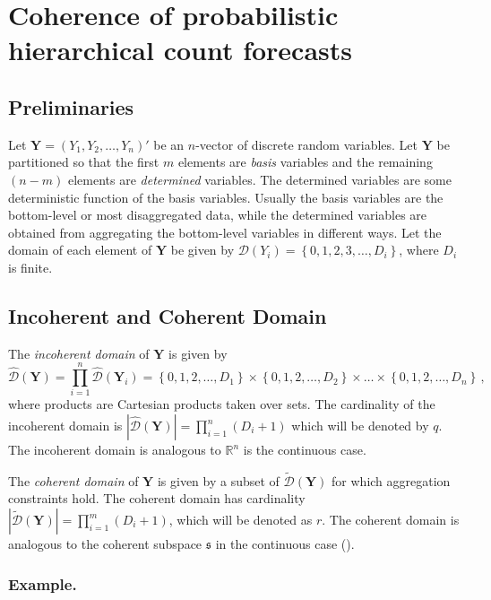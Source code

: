 \documentclass[a4paper,review,12pt,authoryear]{elsarticle}
\newcommand{\bY}{\mathbf{Y}}
\begin{document}
\section{Coherence of probabilistic hierarchical count forecasts}

\label{sec:coherence}

	
\subsection{Preliminaries}
Let $\bY=\left(Y_1,Y_2,\ldots,Y_n\right)'$ be an $n$-vector of discrete random variables.
Let $\bY$ be partitioned so that the first $m$ elements are \textit{basis} variables and the remaining $(n-m)$ elements are \textit{determined} variables.
The determined variables are some deterministic function of the basis variables. Usually the basis variables are the bottom-level or most disaggregated data, while the determined variables are obtained from aggregating the bottom-level variables in different ways. 
Let the domain of each element of $\bY$ be given by $\mathcal{D}(Y_i)=\left\{0, 1,2,3,\dots,D_i\right\}$, where $D_i$ is finite.

\subsection{Incoherent and Coherent Domain}
The \textit{incoherent domain} of $\bY$ is given by
\[
\hat{\mathcal D}(\bY)=\prod\limits_{i=1}^n\hat{\mathcal D}(\bY_i)=\left\{0, 1,2,\dots,D_1\right\}\times\left\{0,1,2,\dots,D_2\right\}\times\dots\times\left\{0,1,2,\dots,D_n\right\}\,,
\] 
where products are Cartesian products taken over sets. The cardinality of the incoherent domain is $|\hat{\mathcal D}(\bY)|=\prod\limits_{i=1}^{n} (D_i+1)$ which will be denoted by $q$. 
The incoherent domain is analogous to $\mathbb{R}^n$ is the continuous case.
  
The \textit{coherent domain} of $\bY$ is given by a subset of $\tilde{\mathcal D}(\bY)$ for which aggregation constraints hold.  
The coherent domain has cardinality $|\tilde{\mathcal D}(\bY)|=\prod\limits_{i=1}^{m} (D_i+1)$, which will be denoted as $r$. 
The coherent domain is analogous to the coherent subspace $\mathfrak{s}$ in the continuous case (\citealp{panagiotelisProbabilisticForecastReconciliation2022}).
  
  \subsubsection*{\textbf{Example}.}
  \label{sec:example}
  
\end{document}

